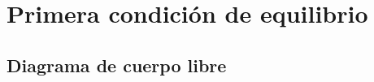 \documentclass[12pt]{beamer}
\begin{document}


\section{Primera condición de equilibrio}
\subsection{Diagrama de cuerpo libre}
\end{document}
